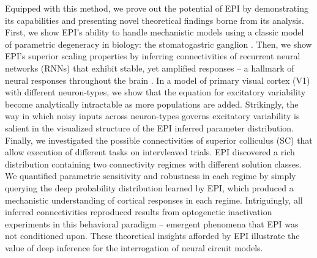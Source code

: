 \documentclass[11pt]{article}
\begin{document}
Equipped with this method, we prove out the potential of EPI by demonstrating its capabilities and presenting novel theoretical findings borne from its analysis.
First, we show EPI's ability to handle mechanistic models using a classic model of parametric degeneracy in biology: the stomatogastric ganglion \cite{goldman2001global, gutierrez2013multiple}.
Then, we show EPI's superior scaling properties by inferring connectivities of recurrent neural networks (RNNs) that exhibit stable, yet amplified responses -- a hallmark of neural responses throughout the brain \cite{murphy2009balanced, hennequin2014optimal, bondanelli2019population}.
In a model of primary visual cortex (V1) with different neuron-types, we show that the equation for excitatory variability become analytically intractable as more populations are added.
Strikingly, the way in which noisy inputs across neuron-types governs excitatory variability is salient in the visualized structure of the EPI inferred parameter distribution.
Finally, we investigated the possible connectivities of superior colliculus (SC) that allow execution of different tasks on intervleaved trials.
EPI discovered a rich distribution containing two connectivity regimes with different solution classes.
We quantified parametric sensitivity and robustness in each regime by simply querying the deep probability distribution learned by EPI, which produced a mechanistic understanding of cortical responses in each regime. 
Intriguingly, all inferred connectivities reproduced results from optogenetic inactivation experiments in this behavioral paradigm -- emergent phenomena that EPI was not conditioned upon.
These theoretical insights afforded by EPI illustrate the value of deep inference for the interrogation of neural circuit models.



\end{document}
